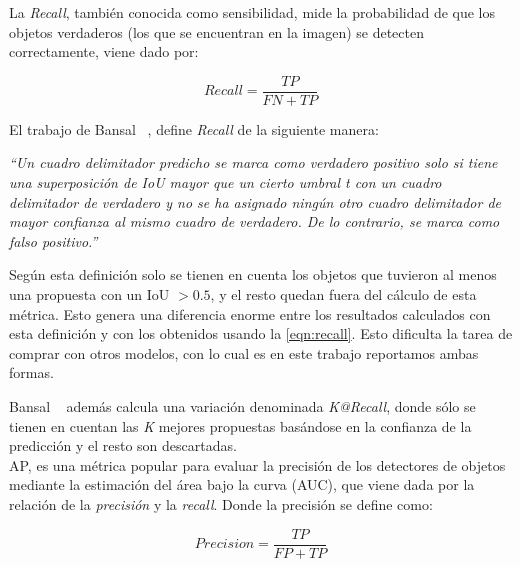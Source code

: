 La \textit{Recall}, también conocida como sensibilidad, mide la probabilidad de que los objetos verdaderos (los que se encuentran en la imagen) se detecten correctamente, viene dado por: 

\begin{equation}
	\label{eqn:recall}
	Recall =\frac{TP}{FN+TP}
\end{equation}

El trabajo de Bansal \etal~\cite{bansal2018zero}, define \textit{Recall} de la siguiente manera: 
\begin{center}
	\textit{``Un cuadro delimitador predicho se marca como verdadero positivo solo si tiene una superposición de IoU mayor que un cierto umbral t con un cuadro delimitador de verdadero y no se ha asignado ningún otro cuadro delimitador de mayor confianza al mismo cuadro de verdadero. De lo contrario, se marca como falso positivo.''}\\
\end{center}

Según esta definición solo se tienen en cuenta los objetos que tuvieron al menos una propuesta con un IoU $> 0.5$, y el resto quedan fuera del cálculo de esta métrica. Esto genera una diferencia enorme entre los resultados calculados con esta definición y con los obtenidos usando la \autoref{eqn:recall}. Esto dificulta la tarea de comprar con otros modelos, con lo cual es en este trabajo reportamos ambas formas. 

Bansal \etal~\cite{bansal2018zero} además calcula una variación denominada \textit{K@Recall}, donde sólo se tienen en cuentan las \textit{K} mejores propuestas basándose en la confianza de la predicción y el resto son descartadas.\\


AP, es una métrica popular para evaluar la precisión de los detectores de objetos mediante la estimación del área bajo la curva (AUC), que viene dada por la relación de la \textit{precisión} y la \textit{recall}. Donde la precisión se define como:

\begin{equation} 
\label{eqn:precision}
Precision =\frac{TP}{FP+TP}
\end{equation}
 
